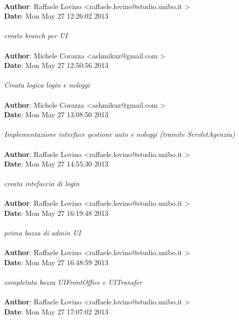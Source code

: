 \documentclass[a4paper,12pt]{article} %
\begin{document}
\\
\textbf{Author}: Raffaele Lovino \textless raffaele.lovino@studio.unibo.it \textgreater \\
\textbf{Date}:   Mon May 27 12:26:02 2013 \\
\\
    \emph{creato branch per UI}\\
\\
\textbf{Author}: Michele Corazza \textless ashmikuz@gmail.com \textgreater \\
\textbf{Date}:   Mon May 27 12:50:56 2013 \\
\\
    \emph{Creata logica login e noleggi}\\
\\
\textbf{Author}: Michele Corazza \textless ashmikuz@gmail.com \textgreater \\
\textbf{Date}:   Mon May 27 13:08:50 2013 \\
\\
    \emph{Implementazione interface gestione auto e noleggi (tramite ServletAgenzia)}\\
\\
\textbf{Author}: Raffaele Lovino \textless raffaele.lovino@studio.unibo.it \textgreater \\
\textbf{Date}:   Mon May 27 14:55:30 2013 \\
\\
    \emph{creata intefaccia di login}\\
\\
\textbf{Author}: Raffaele Lovino \textless raffaele.lovino@studio.unibo.it \textgreater \\
\textbf{Date}:   Mon May 27 16:19:48 2013 \\
\\
    \emph{prima bozza di admin UI}\\
\\
\textbf{Author}: Raffaele Lovino \textless raffaele.lovino@studio.unibo.it \textgreater \\
\textbf{Date}:   Mon May 27 16:48:59 2013 \\
\\
    \emph{completata bozza UIFrontOffice e UITransfer}\\
\\
\textbf{Author}: Raffaele Lovino \textless raffaele.lovino@studio.unibo.it \textgreater \\
\textbf{Date}:   Mon May 27 17:07:02 2013 \\
\\
\end{document}
